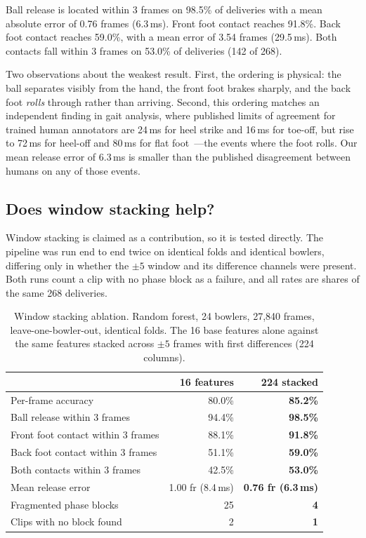 \documentclass[11pt,a4paper]{article}
\begin{document}
Ball release is located within 3 frames on 98.5\% of deliveries with a mean
absolute error of 0.76 frames (6.3\,ms). Front foot contact reaches 91.8\%.
Back foot contact reaches 59.0\%, with a mean error of 3.54 frames (29.5\,ms).
Both contacts fall within 3 frames on 53.0\% of deliveries (142 of 268).

Two observations about the weakest result. First, the ordering is physical:
the ball separates visibly from the hand, the front foot brakes sharply, and
the back foot \emph{rolls} through rather than arriving. Second, this ordering
matches an independent finding in gait analysis, where published limits of
agreement for trained human annotators are 24\,ms for heel strike and 16\,ms
for toe-off, but rise to 72\,ms for heel-off and 80\,ms for flat
foot~\cite{gait2022}---the events where the foot rolls. Our mean release error
of 6.3\,ms is smaller than the published disagreement between humans on any of
those events.

\subsection{Does window stacking help?}
\label{sec:ablation}

Window stacking is claimed as a contribution, so it is tested directly. The
pipeline was run end to end twice on identical folds and identical bowlers,
differing only in whether the $\pm5$ window and its difference channels were
present. Both runs count a clip with no phase block as a failure, and all
rates are shares of the same 268 deliveries.

\begin{table}[htbp]
  \centering
  \caption{Window stacking ablation. Random forest, 24 bowlers, 27{,}840
  frames, leave-one-bowler-out, identical folds. The 16 base features alone
  against the same features stacked across $\pm5$ frames with first
  differences (224 columns).}
  \label{tab:ablation}
  \small
  \begin{tabular}{lrr}
    \toprule
     & 16 features & 224 stacked \\
    \midrule
    Per-frame accuracy & 80.0\% & \textbf{85.2\%} \\
    Ball release within 3 frames & 94.4\% & \textbf{98.5\%} \\
    Front foot contact within 3 frames & 88.1\% & \textbf{91.8\%} \\
    Back foot contact within 3 frames & 51.1\% & \textbf{59.0\%} \\
    Both contacts within 3 frames & 42.5\% & \textbf{53.0\%} \\
    \midrule
    Mean release error & 1.00 fr (8.4\,ms) & \textbf{0.76 fr (6.3\,ms)} \\
    Fragmented phase blocks & 25 & \textbf{4} \\
    Clips with no block found & 2 & \textbf{1} \\
    \bottomrule
  \end{tabular}
\end{table}
\end{document}
